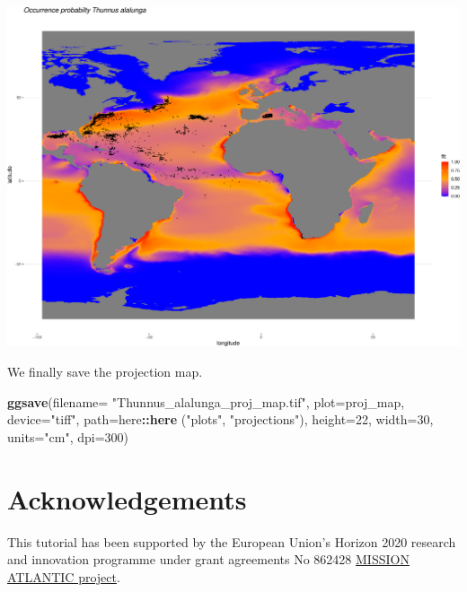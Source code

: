 \documentclass[
]{book}
\newenvironment{Shaded}{\begin{snugshade}}{\end{snugshade}}
\newcommand{\AttributeTok}[1]{\textcolor[rgb]{0.13,0.29,0.53}{#1}}
\newcommand{\DecValTok}[1]{\textcolor[rgb]{0.00,0.00,0.81}{#1}}
\newcommand{\FunctionTok}[1]{\textcolor[rgb]{0.13,0.29,0.53}{\textbf{#1}}}
\newcommand{\NormalTok}[1]{#1}
\newcommand{\SpecialCharTok}[1]{\textcolor[rgb]{0.81,0.36,0.00}{\textbf{#1}}}
\newcommand{\StringTok}[1]{\textcolor[rgb]{0.31,0.60,0.02}{#1}}
\begin{document}
\includegraphics{_main_files/figure-latex/unnamed-chunk-93-1.pdf}

We finally save the projection map.

\begin{Shaded}
\begin{Highlighting}[]
\FunctionTok{ggsave}\NormalTok{(}\AttributeTok{filename=} \StringTok{"Thunnus\_alalunga\_proj\_map.tif"}\NormalTok{, }
        \AttributeTok{plot=}\NormalTok{proj\_map, }
        \AttributeTok{device=}\StringTok{"tiff"}\NormalTok{,}
        \AttributeTok{path=}\NormalTok{here}\SpecialCharTok{::}\FunctionTok{here}\NormalTok{ (}\StringTok{"plots"}\NormalTok{, }\StringTok{"projections"}\NormalTok{), }
        \AttributeTok{height=}\DecValTok{22}\NormalTok{, }\AttributeTok{width=}\DecValTok{30}\NormalTok{,}
        \AttributeTok{units=}\StringTok{"cm"}\NormalTok{, }\AttributeTok{dpi=}\DecValTok{300}\NormalTok{)}
\end{Highlighting}
\end{Shaded}

\chapter{Acknowledgements}\label{acknowledgements}

This tutorial has been supported by the European Union's Horizon 2020 research and innovation programme under grant agreements No 862428 \href{https://missionatlantic.eu/}{MISSION ATLANTIC project}.

  
\end{document}
